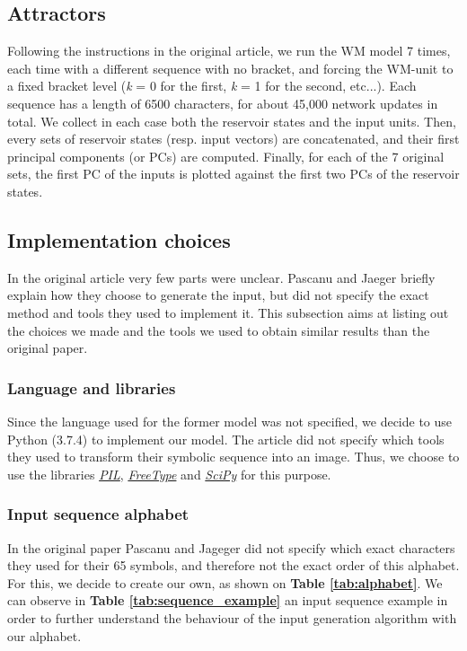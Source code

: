 \subsection{Attractors}

Following the instructions in the original article, we run the WM model 7 times, each time with a different sequence with no bracket, and forcing the WM-unit to a fixed bracket level (\textit{k} = 0 for the first, \textit{k} = 1 for the second, etc...). Each sequence has a length of 6500 characters, for about 45,000 network updates in total. We collect in each case both the reservoir states and the input units. Then, every sets of reservoir states (resp. input vectors) are concatenated, and their first principal components (or PCs) are computed. Finally, for each of the 7 original sets, the first PC of the inputs is plotted against the first two PCs of the reservoir states.

\subsection{Implementation choices}

In the original article very few parts were unclear. Pascanu and Jaeger briefly explain how they choose to generate the input, but did not specify the exact method and tools they used to implement it. This subsection aims at listing out the choices we made and the tools we used to obtain similar results than the original paper.

\subsubsection{Language and libraries}

Since the language used for the former model was not specified, we decide to use Python (3.7.4) to implement our model.
The article did not specify which tools they used to transform their symbolic sequence into an image.
Thus, we choose to use the libraries \href{https://pillow.readthedocs.io/en/stable/}{\textit{PIL}}, \href{https://github.com/rougier/freetype-py}{\textit{FreeType}} and \href{https://www.scipy.org/}{\textit{SciPy}} for this purpose.

\subsubsection{Input sequence alphabet}
\label{s:input_gen2}

In the original paper Pascanu and Jageger did not specify which exact characters they used for their 65 symbols, and therefore not the exact order of this alphabet. For this, we decide to create our own, as shown on \textbf{Table \ref{tab:alphabet}}. We can observe in \textbf{Table \ref{tab:sequence_example}} an input sequence example in order to further understand the behaviour of the input generation algorithm with our alphabet.

